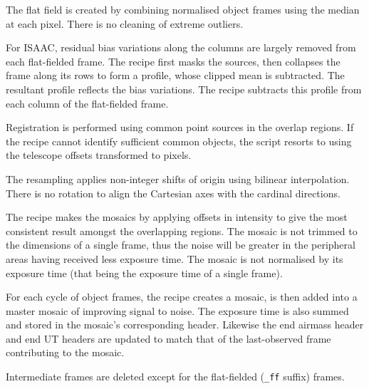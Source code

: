 \documentclass[twoside,11pt,nolof]{starlink}
\begin{document}
{{{         \sstitem
         The flat field is created by combining normalised object
         frames using the median at each pixel.  There is no cleaning
         of extreme outliers.

         \sstitem
         For ISAAC, residual bias variations along the columns are
         largely removed from each flat-fielded frame.  The recipe first
         masks the sources, then collapses the frame along its rows to form
         a profile, whose clipped mean is subtracted.  The resultant profile
         reflects the bias variations.  The recipe subtracts this profile
         from each column of the flat-fielded frame.

         \sstitem
         Registration is performed using common point sources in the
         overlap regions.  If the recipe cannot identify sufficient common
         objects, the script resorts to using the telescope offsets
         transformed to pixels.

         \sstitem
         The resampling applies non-integer shifts of origin using
         bilinear interpolation.  There is no rotation to align the
         Cartesian axes with the cardinal directions.

         \sstitem
         The recipe makes the mosaics by applying offsets in intensity
         to give the most consistent result amongst the overlapping regions.
         The mosaic is not trimmed to the dimensions of a single frame, thus
         the noise will be greater in the peripheral areas having received
         less exposure time.  The mosaic is not normalised by its exposure
         time (that being the exposure time of a single frame).

         \sstitem
         For each cycle of object frames, the recipe creates a mosaic,
         is then added into a master mosaic of improving signal to noise.
         The exposure time is also summed and stored in the mosaic's corresponding
         header.  Likewise the end airmass header and end UT headers are
	 updated to match that of the last-observed frame contributing
	 to the mosaic.

         \sstitem
         Intermediate frames are deleted except for the flat-fielded ({\tt\_ff}
         suffix) frames.
      }
   }
   }
\end{document}
